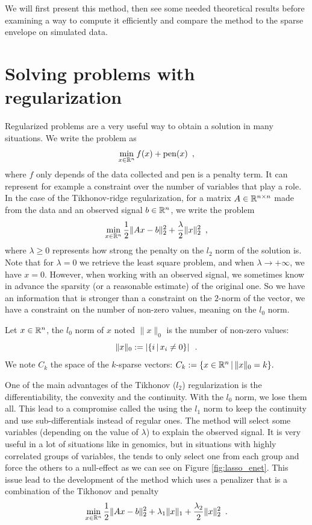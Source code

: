 \documentclass{article}
\begin{document}
We will first present this method, then see some needed theoretical results before examining a way to compute it efficiently and compare the \enet method to the sparse envelope on simulated data.


\section{Solving problems with regularization}

Regularized problems are a very useful way to obtain a solution in many situations. We write the problem as 
\[\min_{x\in\mathbb{R}^n} f(x) + \mathrm{pen}(x)\enspace,\]
where $f$ only depends of the data collected and $\mathrm{pen}$ is a penalty term. It can represent for example a constraint over the number of variables that play a role.
In the case of the Tikhonov-ridge regularization, for a matrix $A\in\mathbb{R}^{n\times n}$ made from the data and an observed signal $b\in\mathbb{R}^n$, we write the problem
\[\min_{x\in\mathbb{R}^n} \frac{1}{2}\|Ax-b\|^2_2 + \frac{\lambda}{2}\|x\|^2_2\enspace,\]
where $\lambda \geq 0$ represents how strong the penalty on the $l_2$ norm of the solution is. Note that for $\lambda = 0$ we retrieve the least square problem, and when $\lambda\rightarrow +\infty$, we have $x=0$.
However, when working with an observed signal, we sometimes know in advance the sparsity (or a reasonable estimate) of the original one. So we have an information that is stronger than a constraint on the $2$-norm of the vector, we have a constraint on the number of non-zero values, meaning on the $l_0$ norm.

\begin{definition}
Let $x\in\mathbb{R}^n$, the $l_0$ norm of $x$ noted $\|x\|_0$ is the number of non-zero values: \[\|x\|_0:=\left|\{i\,|\, x_i\neq 0\}\right|\enspace .\]
We note $C_k$ the space of the $k$-sparse vectors: $C_k := \{x\in\mathbb{R}^n\,|\, \|x\|_0 = k\}.$
\end{definition}

One of the main advantages of the Tikhonov ($l_2$) regularization is the differentiability, the convexity and the continuity. With the $l_0$ norm, we lose them all. This lead to a compromise called the \lasso using the $l_1$ norm to keep the continuity and use sub-differentials instead of regular ones. The \lasso method will select some variables (depending on the value of $\lambda$) to explain the observed signal. It is very useful in a lot of situations like in genomics, but in situations with highly correlated groups of variables, the \lasso tends to only select one from each group and force the others to a null-effect as we can see on Figure \ref{fig:lasso_enet}. This issue lead to the development of the \enet method which uses a penalizer that is a combination of the Tikhonov and \lasso penalty
\[\min_{x\in\mathbb{R}^n} \frac{1}{2}\|Ax-b\|^2_2 + \lambda_1 \|x\|_1 +  \frac{\lambda_2}{2}\|x\|^2_2\enspace.\]
\end{document}
